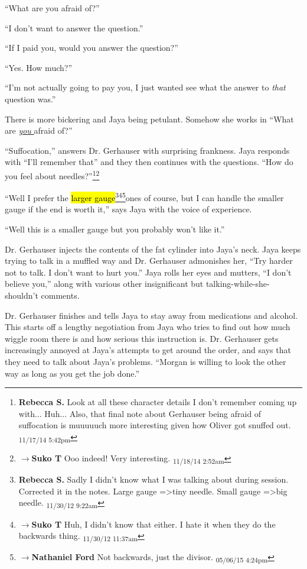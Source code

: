 ``What are you afraid of?''

``I don't want to answer the question.''

``If I paid you, would you answer the question?''

``Yes.  How much?''

``I'm not actually going to pay you, I just wanted see what the answer to \textit{that} question was.''

There is more bickering and Jaya being petulant.  Somehow she works in ``What are \underline{\textit{you} } afraid of?''

``Suffocation,'' answers Dr. Gerhauser with surprising frankness.  Jaya responds with ``I'll remember that'' and they then continues with the questions.  ``How do you feel about needles?''\footnote{\textbf{Rebecca S. }Look at all these character details I don't remember coming up with... Huh... 
Also, that final note about Gerhauser being afraid of suffocation is muuuuuch more interesting given how Oliver got snuffed out. \textsubscript{11/17/14 5:42pm}}\footnote{$\rightarrow$\textbf{Suko T }Ooo indeed!  Very interesting. \textsubscript{11/18/14 2:52am}}

``Well I prefer the \hl{larger gauge}\footnote{\textbf{Rebecca S. }Sadly I didn't know what I was talking about during session.  Corrected it in the notes.  Large gauge =\textgreater  tiny needle.  Small gauge =\textgreater  big needle. \textsubscript{11/30/12 9:22am}}\footnote{$\rightarrow$\textbf{Suko T }Huh, I didn't know that either.  I hate it when they do the backwards thing. \textsubscript{11/30/12 11:37am}}\footnote{$\rightarrow$\textbf{Nathaniel Ford }Not backwards, just the divisor. \textsubscript{05/06/15 4:24pm}}ones of course, but I can handle the smaller gauge if the end is worth it,'' says Jaya with the voice of experience.

``Well this is a smaller gauge but you probably won't like it.''



Dr. Gerhauser injects the contents of the fat cylinder into Jaya's neck.  Jaya keeps trying to talk in a muffled way and Dr. Gerhauser admonishes her, ``Try harder not to talk.  I don't want to hurt you.''  Jaya rolls her eyes and mutters, ``I don't believe you,'' along with various other insignificant but talking-while-she-shouldn't comments. 



Dr. Gerhauser finishes and tells Jaya to stay away from medications and alcohol.  This starts off a lengthy negotiation from Jaya who tries to find out how much wiggle room there is and how serious this instruction is. Dr. Gerhauser gets increasingly annoyed at Jaya's attempts to get around the order, and says that they need to talk about Jaya's problems.  ``Morgan is willing to look the other way as long as you get the job done.''

